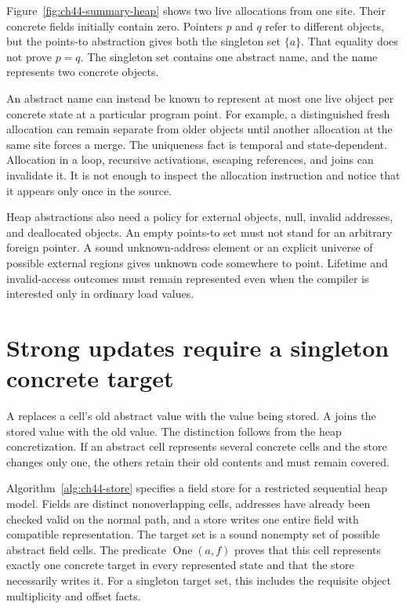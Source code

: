 Figure~\ref{fig:ch44-summary-heap} shows two live allocations from one site.
Their concrete fields initially contain zero.
Pointers $p$ and $q$ refer to different objects, but the points-to abstraction gives both the singleton set $\{a\}$.
That equality does not prove $p=q$.
The singleton set contains one abstract name, and the name represents two concrete objects.



An abstract name can instead be known to represent at most one live object per concrete state at a particular program point.
For example, a distinguished fresh allocation can remain separate from older objects until another allocation at the same site forces a merge.
The uniqueness fact is temporal and state-dependent.
Allocation in a loop, recursive activations, escaping references, and joins can invalidate it.
It is not enough to inspect the allocation instruction and notice that it appears only once in the source.

Heap abstractions also need a policy for external objects, null, invalid addresses, and deallocated objects.
An empty points-to set must not stand for an arbitrary foreign pointer.
A sound unknown-address element or an explicit universe of possible external regions gives unknown code somewhere to point.
Lifetime and invalid-access outcomes must remain represented even when the compiler is interested only in ordinary load values.

\section{Strong updates require a singleton concrete target}
\label{sec:ch44-updates}

A  replaces a cell's old abstract value with the value being stored.
A  joins the stored value with the old value.
The distinction follows from the heap concretization.
If an abstract cell represents several concrete cells and the store changes only one, the others retain their old contents and must remain covered.

Algorithm~\ref{alg:ch44-store} specifies a field store for a restricted sequential heap model.
Fields are distinct nonoverlapping cells, addresses have already been checked valid on the normal path, and a store writes one entire field with compatible representation.
The target set is a sound nonempty set of possible abstract field cells.
The predicate $\operatorname{One}(a,f)$ proves that this cell represents exactly one concrete target in every represented state and that the store necessarily writes it.
For a singleton target set, this includes the requisite object multiplicity and offset facts.

